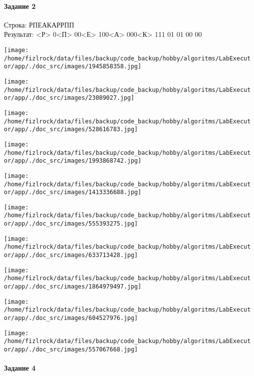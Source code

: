 \documentclass[a4paper, 12pt]{article}
\begin{document}
\paragraph{Задание 2}

Строка: 
РПЕАКАРРПП\\
Результат: <Р> 0<П> 00<Е> 100<А> 000<К> 111 01 01 00 00

\texttt{[image: /home/fizlrock/data/files/backup/code\_backup/hobby/algoritms/LabExecutor/app/./doc\_src/images/1945858358.jpg]}

\texttt{[image: /home/fizlrock/data/files/backup/code\_backup/hobby/algoritms/LabExecutor/app/./doc\_src/images/23089027.jpg]}

\texttt{[image: /home/fizlrock/data/files/backup/code\_backup/hobby/algoritms/LabExecutor/app/./doc\_src/images/528616783.jpg]}

\texttt{[image: /home/fizlrock/data/files/backup/code\_backup/hobby/algoritms/LabExecutor/app/./doc\_src/images/1993868742.jpg]}

\texttt{[image: /home/fizlrock/data/files/backup/code\_backup/hobby/algoritms/LabExecutor/app/./doc\_src/images/1413336688.jpg]}

\texttt{[image: /home/fizlrock/data/files/backup/code\_backup/hobby/algoritms/LabExecutor/app/./doc\_src/images/555393275.jpg]}

\texttt{[image: /home/fizlrock/data/files/backup/code\_backup/hobby/algoritms/LabExecutor/app/./doc\_src/images/633713428.jpg]}

\texttt{[image: /home/fizlrock/data/files/backup/code\_backup/hobby/algoritms/LabExecutor/app/./doc\_src/images/1864979497.jpg]}

\texttt{[image: /home/fizlrock/data/files/backup/code\_backup/hobby/algoritms/LabExecutor/app/./doc\_src/images/604527976.jpg]}

\texttt{[image: /home/fizlrock/data/files/backup/code\_backup/hobby/algoritms/LabExecutor/app/./doc\_src/images/557067668.jpg]}
\pagebreak
\paragraph{Задание 4}
\end{document}
